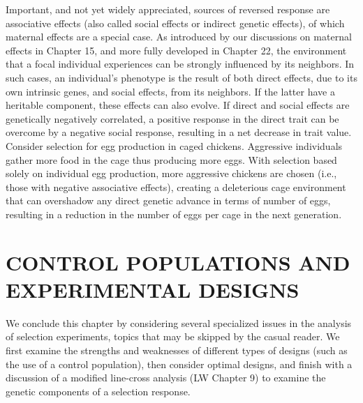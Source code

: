 \documentclass{article}
\begin{document}
Important, and not yet widely appreciated, sources of reversed response are associative effects (also called social effects or indirect genetic effects), of which maternal effects are a special case. As introduced by our discussions on maternal effects in Chapter 15, and more fully developed in Chapter 22, the environment that a focal individual experiences can be strongly influenced by its neighbors. In such cases, an individual's phenotype is the result of both direct effects, due to its own intrinsic genes, and social effects, from its neighbors. If the latter have a heritable component, these effects can also evolve. If direct and social effects are genetically negatively correlated, a positive response in the direct trait can be overcome by a negative social response, resulting in a net decrease in trait value. Consider selection for egg production in caged chickens. Aggressive individuals gather more food in the cage thus producing more eggs. With selection based solely on individual egg production, more aggressive chickens are chosen (i.e., those with negative associative effects), creating a deleterious cage environment that can overshadow any direct genetic advance in terms of number of eggs, resulting in a reduction in the number of eggs per cage in the next generation.

\section{CONTROL POPULATIONS AND EXPERIMENTAL DESIGNS}
We conclude this chapter by considering several specialized issues in the analysis of selection experiments, topics that may be skipped by the casual reader. We first examine the strengths and weaknesses of different types of designs (such as the use of a control population), then consider optimal designs, and finish with a discussion of a modified line-cross analysis (LW Chapter 9) to examine the genetic components of a selection response.
\end{document}
